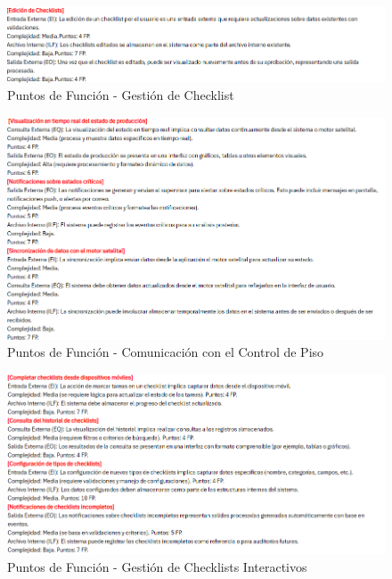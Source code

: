 \documentclass[12pt,letterpaper,spanish, xcolor=table]{report}
\numberwithin{figure}{subsection}
\begin{document}
	\begin{figure}[H]
		\centering
		\includegraphics[width=1.0\textwidth]
		{Imagenes/PathAyuda/FpsDependeciasChecklist.png}
		\caption{Puntos de Función - Gestión de Checklist
		}\label{a2}
	\end{figure}
	
	\begin{figure}[H]
		\centering
		\includegraphics[width=1.0\textwidth]
		{Imagenes/PathAyuda/FpsComunicacionPiso.png}
		\caption{Puntos de Función - Comunicación con el Control de Piso 
		}\label{a2}
	\end{figure}
	
	\begin{figure}[H]
		\centering
		\includegraphics[width=1.0\textwidth]
		{Imagenes/PathAyuda/FpsChecklistsInteractivos.png}
		\caption{Puntos de Función - Gestión de Checklists Interactivos 
		}\label{a2}
	\end{figure}
	
\end{document}
